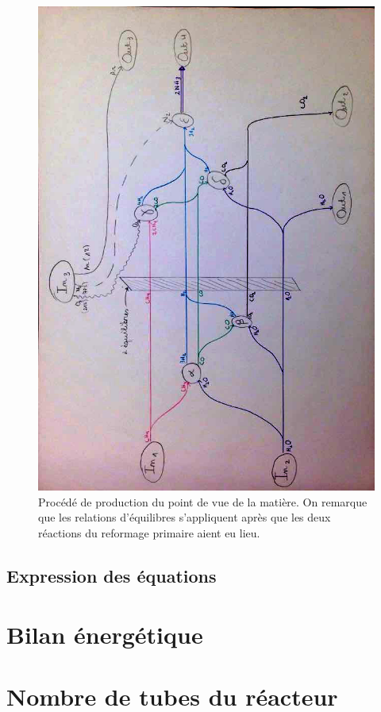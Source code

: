 \documentclass[a4paper,12pt]{article}
\begin{document}
\begin{figure}
    \centering
    \includegraphics[width=.9\textwidth]{flows_matter}
    \caption{
        Procédé de production du point de vue de la matière.
        On remarque que les relations d'équilibres s'appliquent après que les deux
        réactions du reformage primaire aient eu lieu.
    }
    \label{fig:flows-matter}
\end{figure}

\subsection{Expression des équations}



\section{Bilan énergétique}

\section{Nombre de tubes du réacteur}
\end{document}
